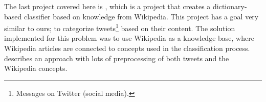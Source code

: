The last project covered here is \cite{entityextraction}, which is a project that creates a dictionary-based classifier based on knowledge from Wikipedia. This project has a goal very similar to ours; to categorize tweets\footnote{Messages on Twitter (social media).} based on their content. The solution implemented for this problem was to use Wikipedia as a knowledge base, where Wikipedia articles are connected to concepts used in the classification process. \cite{entityextraction} describes an approach with lots of preprocessing of both tweets and the Wikipedia concepts. 
